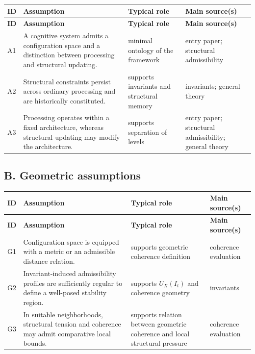 \documentclass[11pt,a4paper]{article}
\begin{document}
	\begin{longtable}{>{\RaggedRight\arraybackslash}p{}
			>{\RaggedRight\arraybackslash}p{}
			>{\RaggedRight\arraybackslash}p{}
			>{\RaggedRight\arraybackslash}p{}}
		\toprule
		\textbf{ID} & \textbf{Assumption} & \textbf{Typical role} & \textbf{Main source(s)} \\
		\midrule
		\endfirsthead
		\toprule
		\textbf{ID} & \textbf{Assumption} & \textbf{Typical role} & \textbf{Main source(s)} \\
		\midrule
		\endhead
		
		A1 & A cognitive system admits a configuration space and a distinction between processing and structural updating. & minimal ontology of the framework & entry paper; structural admissibility \\
		
		A2 & Structural constraints persist across ordinary processing and are historically constituted. & supports invariants and structural memory & invariants; general theory \\
		
		A3 & Processing operates within a fixed architecture, whereas structural updating may modify the architecture. & supports separation of levels & entry paper; structural admissibility; general theory \\
		
		\bottomrule
	\end{longtable}
	
	\subsection{B. Geometric assumptions}
	
	\begin{longtable}{>{\RaggedRight\arraybackslash}p{}
			>{\RaggedRight\arraybackslash}p{}
			>{\RaggedRight\arraybackslash}p{}
			>{\RaggedRight\arraybackslash}p{}}
		\toprule
		\textbf{ID} & \textbf{Assumption} & \textbf{Typical role} & \textbf{Main source(s)} \\
		\midrule
		\endfirsthead
		\toprule
		\textbf{ID} & \textbf{Assumption} & \textbf{Typical role} & \textbf{Main source(s)} \\
		\midrule
		\endhead
		
		G1 & Configuration space is equipped with a metric or an admissible distance relation. & supports geometric coherence definition & coherence evaluation \\
		
		G2 & Invariant-induced admissibility profiles are sufficiently regular to define a well-posed stability region. & supports $U_X(I_t)$ and coherence geometry & invariants \\
		
		G3 & In suitable neighborhoods, structural tension and coherence may admit comparative local bounds. & supports relation between geometric coherence and local structural pressure & coherence evaluation \\
		
		\bottomrule
	\end{longtable}
	
\end{document}
